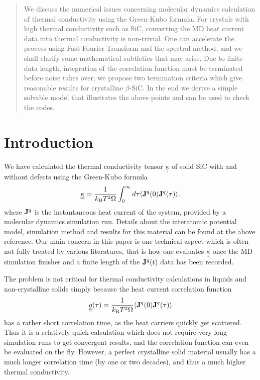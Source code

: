\date{\today}
\maketitle
\begin{abstract}
  We discuss the numerical issues concerning molecular dynamics
  calculation of thermal conductivity using the Green-Kubo formula.
  For crystals with high thermal conductivity such as SiC, converting
  the MD heat current data into thermal conductivity is non-trivial.
  One can accelerate the process using Fast Fourier Transform and the
  spectral method, and we shall clarify some mathematical subtleties
  that may arise. Due to finite data length, integration of the
  correlation function must be terminated before noise takes over; we
  propose two termination criteria which give reasonable results for
  crystalline $\beta$-SiC.  In the end we derive a simple solvable
  model that illustrates the above points and can be used to check the
  codes.
\end{abstract}

 
\narrowtext

\section{Introduction}
\label{sec:introduction}

We have calculated the thermal conductivity tensor
$\underline{\underline{\kappa}}$ of solid SiC with and without
defects\cite{Li} using the Green-Kubo formula\cite{Green-Kubo}
\begin{equation}
\underline{\underline{\kappa}} =
\frac{1}{k_{\rm B}T^2\Omega}\int_{0}^{\infty}d\tau \langle
{\bf J}^q(0){\bf J}^q(\tau) \rangle,
\label{first}
\end{equation}
where ${\bf J}^q$ is the instantaneous heat current of the system,
provided by a molecular dynamics simulation
run\cite{Ladd,Lee,Kitagawa,Kaburaki}. Details about the interatomic
potential model, simulation method and results for this material can
be found at the above reference. Our main concern in this paper is one
technical aspect which is often not fully treated by various
literatures, that is how one evaluates
$\underline{\underline{\kappa}}$ once the MD simulation finishes and a
finite length of the ${\bf J}^q(t)$ data has been recorded.

The problem is not critical for thermal conductivity calculations in
liquids and non-crystalline solids simply because the heat current
correlation function
\begin{equation}
\underline{\underline{g}} (\tau) = \frac{1}{k_{\rm B}T^2\Omega} \langle
{\bf J}^q(0){\bf J}^q(\tau) \rangle
\label{corfun}
\end{equation}
has a rather short correlation time, as the heat carriers quickly get
scattered. Thus it is a relatively quick calculation which does not
require very long simulation runs to get convergent results, and the
correlation function can even be evaluated on the fly.  However, a
perfect crystalline solid material usually has a much longer
correlation time (by one or two decades), and thus a much higher
thermal conductivity\cite{explain_g}.

